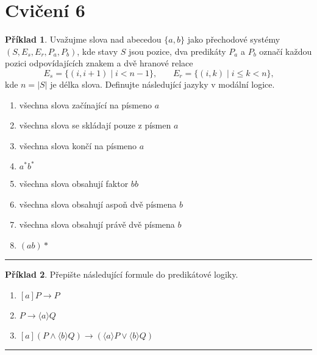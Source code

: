 \documentclass[a4paper]{article}
\theoremstyle{definition}
\newtheorem{priklad}{Příklad}
\begin{document}
\newpage
\section*{Cvičení 6}
\setcounter{priklad}{0}
\begin{priklad}
    Uvažujme slova nad abecedou $ \{a,b\} $ jako přechodové systémy $ (S,E_s,E_r,P_a,P_b) $, kde stavy $ S $ jsou pozice, dva predikáty $ P_a $ a $ P_b $ označí každou pozici odpovídajících znakem a dvě hranové relace
    \[ E_s = \{(i,i+1) \mid i<n-1\}\mbox{,}\qquad E_r = \{(i,k) \mid i\leq k<n\}\mbox{,} \]
    kde $ n = |S| $ je délka slova. Definujte následující jazyky v modální logice.
    
    \begin{enumerate}
      \item všechna slova začínající na písmeno $ a $
      \item všechna slova se skládají pouze z písmen $ a $
      \item všechna slova končí na písmeno $ a $
      \item $ a^*b^* $
      \item všechna slova obsahují faktor $ bb $
      \item všechna slova obsahují aspoň dvě písmena $ b $
      \item všechna slova obsahují právě dvě písmena $ b $
      \item $ (ab)* $
    \end{enumerate}
    
\noindent\rule{\linewidth}{.2pt}    
\end{priklad}

\begin{priklad}
    Přepište následující formule do predikátové logiky.
    
    \begin{enumerate}
      \item $ [a]P\rightarrow P $
      \item $ P\rightarrow \langle a\rangle Q $
      \item $ [a](P\wedge \langle b\rangle Q) \rightarrow (\langle a\rangle P\vee\langle b\rangle Q) $
    \end{enumerate}
    
\noindent\rule{\linewidth}{.2pt}    
\end{priklad}
\end{document}
